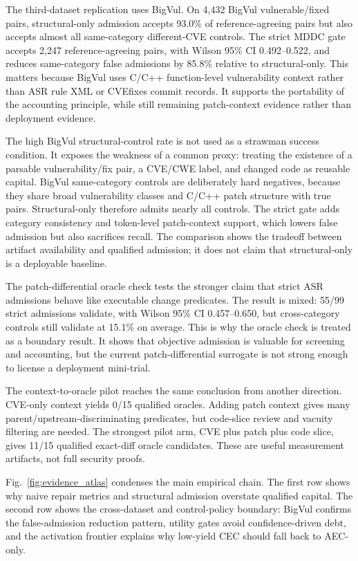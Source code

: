 ﻿\documentclass[lettersize,journal]{IEEEtran}
\begin{document}
The third-dataset replication uses BigVul. On 4,432 BigVul vulnerable/fixed pairs, structural-only admission accepts 93.0\% of reference-agreeing pairs but also accepts almost all same-category different-CVE controls. The strict MDDC gate accepts 2,247 reference-agreeing pairs, with Wilson 95\% CI 0.492--0.522, and reduces same-category false admissions by 85.8\% relative to structural-only. This matters because BigVul uses C/C++ function-level vulnerability context rather than ASR rule XML or CVEfixes commit records. It supports the portability of the accounting principle, while still remaining patch-context evidence rather than deployment evidence.

The high BigVul structural-control rate is not used as a strawman success condition. It exposes the weakness of a common proxy: treating the existence of a parsable vulnerability/fix pair, a CVE/CWE label, and changed code as reusable capital. BigVul same-category controls are deliberately hard negatives, because they share broad vulnerability classes and C/C++ patch structure with true pairs. Structural-only therefore admits nearly all controls. The strict gate adds category consistency and token-level patch-context support, which lowers false admission but also sacrifices recall. The comparison shows the tradeoff between artifact availability and qualified admission; it does not claim that structural-only is a deployable baseline.

The patch-differential oracle check tests the stronger claim that strict ASR admissions behave like executable change predicates. The result is mixed: 55/99 strict admissions validate, with Wilson 95\% CI 0.457--0.650, but cross-category controls still validate at 15.1\% on average. This is why the oracle check is treated as a boundary result. It shows that objective admission is valuable for screening and accounting, but the current patch-differential surrogate is not strong enough to license a deployment mini-trial.

The context-to-oracle pilot reaches the same conclusion from another direction. CVE-only context yields 0/15 qualified oracles. Adding patch context gives many parent/upstream-discriminating predicates, but code-slice review and vacuity filtering are needed. The strongest pilot arm, CVE plus patch plus code slice, gives 11/15 qualified exact-diff oracle candidates. These are useful measurement artifacts, not full security proofs.

Fig.~\ref{fig:evidence_atlas} condenses the main empirical chain. The first row shows why naive repair metrics and structural admission overstate qualified capital. The second row shows the cross-dataset and control-policy boundary: BigVul confirms the false-admission reduction pattern, utility gates avoid confidence-driven debt, and the activation frontier explains why low-yield CEC should fall back to AEC-only.
\end{document}

